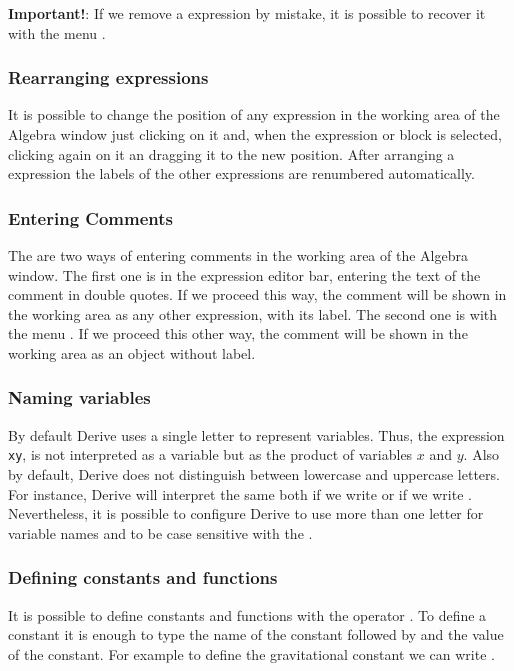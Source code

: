 \textbf{Important!}: If we remove a expression by mistake, it is possible to recover it with the menu .

\subsubsection*{Rearranging expressions}
It is possible to change the position of any expression in the working area of the Algebra window just clicking on it and, when the expression or block is selected, clicking again on it an dragging it to the new position.  
After arranging a expression the labels of the other expressions are renumbered automatically. 

\subsubsection*{Entering Comments}
The are two ways of entering comments in the working area of the Algebra window. 
The first one is in the expression editor bar, entering the text of the comment in double quotes.
If we proceed this way, the comment will be shown in the working area as any other expression, with its label. 
The second one is with the menu .
If we proceed this other way, the comment will be shown in the working area as an object without label. 

\subsubsection*{Naming variables}
By default Derive uses a single letter to represent variables. 
Thus, the expression \texttt{xy}, is not interpreted as a variable but as the product of variables $x$ and $y$.
Also by default, Derive does not distinguish between lowercase and uppercase letters.
For instance, Derive will interpret the same both if we write  or if we write .
Nevertheless, it is possible to configure Derive to use more than one letter for variable names and to be case sensitive with the .

\subsubsection*{Defining constants and functions}
It is possible to define constants and functions with the operator \command{:=}.
To define a constant it is enough to type the name of the constant followed by \command{:=} and the value of the constant.
For example to define the gravitational constant we can write . 

